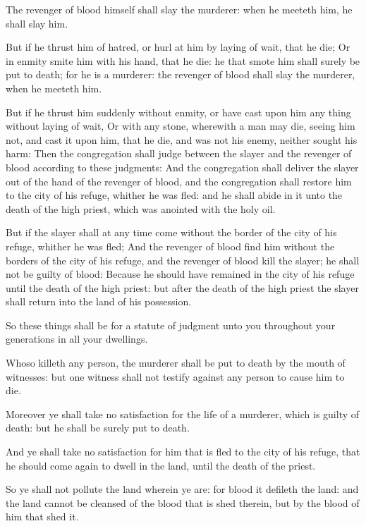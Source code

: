 \verse The revenger of blood himself shall slay the murderer: when he
meeteth him, he shall slay him.

\verse But if he thrust him of hatred, or hurl at him by laying of
wait, that he die; \verse Or in enmity smite him with his hand, that he
die: he that smote him shall surely be put to death; for he is a
murderer: the revenger of blood shall slay the murderer, when he
meeteth him.

\verse But if he thrust him suddenly without enmity, or have cast upon
him any thing without laying of wait, \verse Or with any stone,
wherewith a man may die, seeing him not, and cast it upon him, that he
die, and was not his enemy, neither sought his harm: \verse Then the
congregation shall judge between the slayer and the revenger of blood
according to these judgments: \verse And the congregation shall deliver
the slayer out of the hand of the revenger of blood, and the
congregation shall restore him to the city of his refuge, whither he
was fled: and he shall abide in it unto the death of the high priest,
which was anointed with the holy oil.

\verse But if the slayer shall at any time come without the border of
the city of his refuge, whither he was fled; \verse And the revenger of
blood find him without the borders of the city of his refuge, and the
revenger of blood kill the slayer; he shall not be guilty of blood:
\verse Because he should have remained in the city of his refuge until
the death of the high priest: but after the death of the high priest
the slayer shall return into the land of his possession.

\verse So these things shall be for a statute of judgment unto you
throughout your generations in all your dwellings.

\verse Whoso killeth any person, the murderer shall be put to death by
the mouth of witnesses: but one witness shall not testify against any
person to cause him to die.

\verse Moreover ye shall take no satisfaction for the life of a
murderer, which is guilty of death: but he shall be surely put to
death.

\verse And ye shall take no satisfaction for him that is fled to the
city of his refuge, that he should come again to dwell in the land,
until the death of the priest.

\verse So ye shall not pollute the land wherein ye are: for blood it
defileth the land: and the land cannot be cleansed of the blood that
is shed therein, but by the blood of him that shed it.

